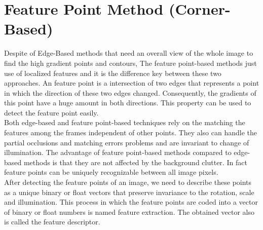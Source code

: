 \section{Feature Point Method (Corner-Based)} \label{sec:feature_point_method}
Despite of Edge-Based methods that need an overall view of the whole image to find the high gradient points and contours, The feature point-based methods just use of localized features and it is the difference key between these two approaches. An feature point is a intersection of two edges that represents a point in which the direction of these two edges changed. Consequently, the gradients of this point have a huge amount in both directions. This property can be used to detect the feature point easily.\\
Both edge-based and feature point-based techniques rely on the matching the features among the frames independent of other points. They also can handle the partial occlusions and matching errors problems and are invariant to change of illumination. The advantage of feature point-based methods compared to edge-based methods is that they are not affected by the background clutter. In fact feature points can be uniquely recognizable between all image pixels.\\
After detecting the feature points of an image, we need to describe these points as a unique binary or float vectors that preserve invariance to the rotation, scale and illumination. This process in which the feature points are coded into a vector of binary or float numbers is named feature extraction. The obtained vector also is called the feature descriptor.\\

